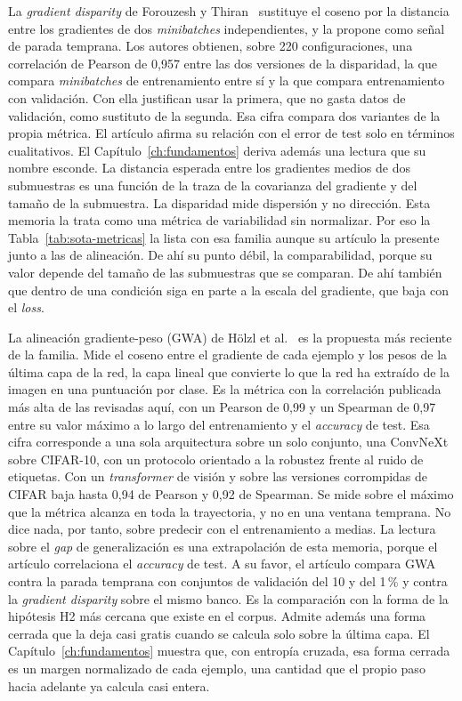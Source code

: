 La \emph{gradient disparity} de Forouzesh y Thiran~\cite{forouzesh2021disparity} sustituye el coseno por la distancia entre los gradientes de dos \emph{minibatches} independientes, y la propone como señal de parada temprana. Los autores obtienen, sobre 220 configuraciones, una correlación de Pearson de 0,957 entre las dos versiones de la disparidad, la que compara \emph{minibatches} de entrenamiento entre sí y la que compara entrenamiento con validación. Con ella justifican usar la primera, que no gasta datos de validación, como sustituto de la segunda. Esa cifra compara dos variantes de la propia métrica. El artículo afirma su relación con el error de test solo en términos cualitativos. El Capítulo~\ref{ch:fundamentos} deriva además una lectura que su nombre esconde. La distancia esperada entre los gradientes medios de dos submuestras es una función de la traza de la covarianza del gradiente y del tamaño de la submuestra. La disparidad mide dispersión y no dirección. Esta memoria la trata como una métrica de variabilidad sin normalizar. Por eso la Tabla~\ref{tab:sota-metricas} la lista con esa familia aunque su artículo la presente junto a las de alineación. De ahí su punto débil, la comparabilidad, porque su valor depende del tamaño de las submuestras que se comparan. De ahí también que dentro de una condición siga en parte a la escala del gradiente, que baja con el \emph{loss}.

La alineación gradiente-peso (GWA) de Hölzl et al.~\cite{hoelzl2025gradient} es la propuesta más reciente de la familia. Mide el coseno entre el gradiente de cada ejemplo y los pesos de la última capa de la red, la capa lineal que convierte lo que la red ha extraído de la imagen en una puntuación por clase. Es la métrica con la correlación publicada más alta de las revisadas aquí, con un Pearson de 0,99 y un Spearman de 0,97 entre su valor máximo a lo largo del entrenamiento y el \emph{accuracy} de test. Esa cifra corresponde a una sola arquitectura sobre un solo conjunto, una ConvNeXt sobre CIFAR-10, con un protocolo orientado a la robustez frente al ruido de etiquetas. Con un \emph{transformer} de visión y sobre las versiones corrompidas de CIFAR baja hasta 0,94 de Pearson y 0,92 de Spearman. Se mide sobre el máximo que la métrica alcanza en toda la trayectoria, y no en una ventana temprana. No dice nada, por tanto, sobre predecir con el entrenamiento a medias. La lectura sobre el \emph{gap} de generalización es una extrapolación de esta memoria, porque el artículo correlaciona el \emph{accuracy} de test. A su favor, el artículo compara GWA contra la parada temprana con conjuntos de validación del 10 y del 1\,\% y contra la \emph{gradient disparity} sobre el mismo banco. Es la comparación con la forma de la hipótesis H2 más cercana que existe en el corpus. Admite además una forma cerrada que la deja casi gratis cuando se calcula solo sobre la última capa. El Capítulo~\ref{ch:fundamentos} muestra que, con entropía cruzada, esa forma cerrada es un margen normalizado de cada ejemplo, una cantidad que el propio paso hacia adelante ya calcula casi entera.

